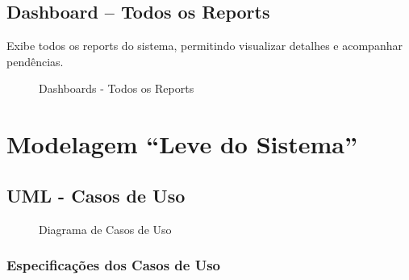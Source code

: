 \documentclass[12pt,a4paper]{article}
\begin{document}
\subsection{Dashboard – Todos os Reports}
Exibe todos os reports do sistema, permitindo visualizar detalhes e acompanhar pendências.

\begin{figure}[H]
\centering
{}
 
\caption{Dashboards - Todos os Reports}
\end{figure}

\section{Modelagem ``Leve do Sistema''}
\label{sec:modelagem}

\subsection{UML - Casos de Uso}

\begin{figure}[H]
\centering

\caption{Diagrama de Casos de Uso}
\end{figure}

\subsubsection{Especificações dos Casos de Uso}
\end{document}
